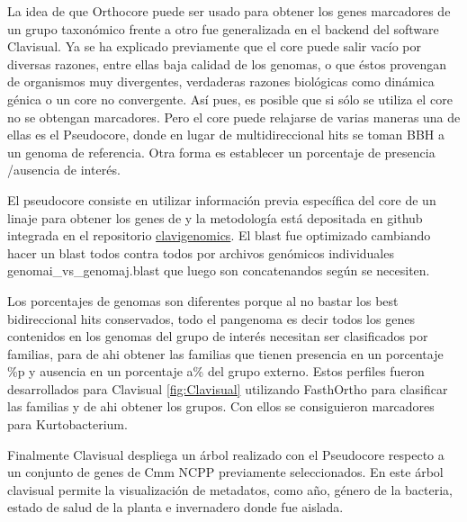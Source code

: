 \documentclass[12pt,twoside]{reedthesis}
\begin{document}
  La idea de que Orthocore puede ser usado para obtener los genes
  marcadores de un grupo taxonómico frente a otro fue generalizada en el
  backend del software Clavisual. Ya se ha explicado previamente que el
  core puede salir vacío por diversas razones, entre ellas baja calidad de
  los genomas, o que éstos provengan de organismos muy divergentes,
  verdaderas razones biológicas como dinámica génica o un core no
  convergente. Así pues, es posible que si sólo se utiliza el core no se
  obtengan marcadores. Pero el core puede relajarse de varias maneras una
  de ellas es el Pseudocore, donde en lugar de multidireccional hits se
  toman BBH a un genoma de referencia. Otra forma es establecer un
  porcentaje de presencia /ausencia de interés.
  
  El pseudocore consiste en utilizar información previa específica del
  core de un linaje para obtener los genes de y la metodología está
  depositada en github integrada en el repositorio
  \href{https://github.com/nselem/clavigenomics}{clavigenomics}. El blast
  fue optimizado cambiando hacer un blast todos contra todos por archivos
  genómicos individuales genomai\_vs\_genomaj.blast que luego son
  concatenandos según se necesiten.
  
  Los porcentajes de genomas son diferentes porque al no bastar los best
  bidireccional hits conservados, todo el pangenoma es decir todos los
  genes contenidos en los genomas del grupo de interés necesitan ser
  clasificados por familias, para de ahi obtener las familias que tienen
  presencia en un porcentaje \%p y ausencia en un porcentaje a\% del grupo
  externo. Estos perfiles fueron desarrollados para Clavisual
  \autoref{fig:Clavisual} utilizando FasthOrtho para clasificar las
  familias y de ahi obtener los grupos. Con ellos se consiguieron
  marcadores para Kurtobacterium.
  
  Finalmente Clavisual despliega un árbol realizado con el Pseudocore
  respecto a un conjunto de genes de Cmm NCPP previamente seleccionados.
  En este árbol clavisual permite la visualización de metadatos, como año,
  género de la bacteria, estado de salud de la planta e invernadero donde
  fue aislada.
  
\end{document}
